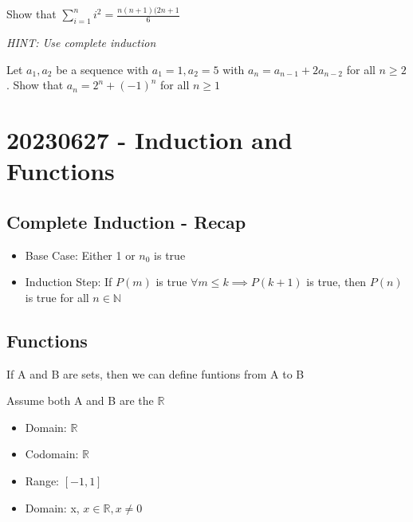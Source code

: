 \documentclass{report}
\begin{document}
     {
      Show that $\sum^{n}_{i=1} i^2 = \frac{n(n+1)(2n+1}{6} $
    }
     {
      \emph{HINT:  Use complete induction}

      Let $a_1, a_2$ be a sequence with $a_1=1, a_2=5$ with
      $a_n = a_{n-1}+2a_{n-2}$ for all $n \geq2$.  Show that
      $a_n = 2^n+(-1)^n$ for all $n \geq 1$
    }
\section*{20230627 - Induction and Functions}%
  \subsection*{Complete Induction - Recap}%
  \begin{itemize}
    \item Base Case: Either 1 or $n_0$ is true
    \item Induction Step: If $P(m)$ is true $\forall m \leq k \implies
      P(k+1)$ is true, then $P(n)$ is true for all $n \in \mathbb{N}$
       {
        
      }
  \end{itemize}

  \subsection*{Functions}%

    If A and B are sets, then we can define funtions from A to B

    Assume both A and B are the $\mathbb{R}$


     {
      \begin{itemize}
        \item Domain:  $\mathbb{R}$
        \item Codomain:  $\mathbb{R}$
        \item Range: $[-1,1]$
      \end{itemize}
    }
     {
      \begin{itemize}
        \item Domain: x, $x \in \mathbb{R}, x \neq 0$
      \end{itemize}
    }
\end{document}
